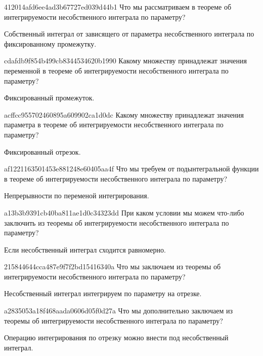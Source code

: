 \begin{note}{412014afd6ee4ad3b67727ed039d44b1}
    Что мы рассматриваем в теореме об интегрируемости несобственного интеграла по параметру?

    \begin{cloze}{1}
        Собственный интеграл от зависящего от параметра несобственного интеграла по фиксированному промежутку.
    \end{cloze}
\end{note}

\begin{note}{cdafdb9f854b499cb8344534620b1990}
    Какому множеству принадлежат значения переменной в теореме об интегрируемости несобственного интеграла по параметру?

    \begin{cloze}{1}
        Фиксированный промежуток.
    \end{cloze}
\end{note}

\begin{note}{acffcc955702460895a609902ca1d0dc}
    Какому множеству принадлежат значения параметра в теореме об интегрируемости несобственного интеграла по параметру?

    \begin{cloze}{1}
        Фиксированный отрезок.
    \end{cloze}
\end{note}

\begin{note}{af1221163501453e881248e60405aa4f}
    Что мы требуем от подынтегральной функции в теореме об интегрируемости несобственного интеграла по параметру?

    \begin{cloze}{1}
        Непрерывности по переменой интегрирования.
    \end{cloze}
\end{note}

\begin{note}{a13b3b9391cb40ba811ae1d0c34323dd}
    При каком условии мы можем что-либо заключить из теоремы об интегрируемости несобственного интеграла по параметру?

    \begin{cloze}{1}
        Если несобственный интеграл сходится равномерно.
    \end{cloze}
\end{note}

\begin{note}{215844644cca487e9f7f2bd15416340a}
    Что мы заключаем из теоремы об интегрируемости несобственного интеграла по параметру?

    \begin{cloze}{1}
        Несобственный интеграл интегрируем по параметру на отрезке.
    \end{cloze}
\end{note}

\begin{note}{a2835053a18f468aada0606d05f0d27a}
    Что мы дополнительно заключаем из теоремы об интегрируемости несобственного интеграла по параметру?

    \begin{cloze}{1}
        Операцию интегрирования по отрезку можно внести под несобственный интеграл.
    \end{cloze}
\end{note}


